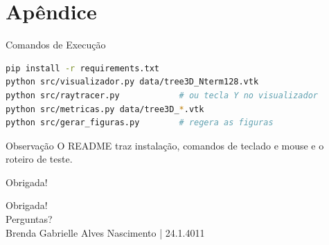 \documentclass[aspectratio=169,11pt]{beamer}
\begin{document}
\appendix
\section{Apêndice}

\begin{frame}[fragile]{Comandos de Execução}
\begin{lstlisting}[language=bash]
pip install -r requirements.txt
python src/visualizador.py data/tree3D_Nterm128.vtk
python src/raytracer.py            # ou tecla Y no visualizador
python src/metricas.py data/tree3D_*.vtk
python src/gerar_figuras.py        # regera as figuras
\end{lstlisting}

\begin{block}{Observação}
O README traz instalação, comandos de teclado e mouse e o roteiro de teste.
\end{block}
\end{frame}

\begin{frame}{Obrigada!}
\begin{center}
{\Huge Obrigada!}\\[0.5cm]
{\large Perguntas?}\\[0.5cm]
Brenda Gabrielle Alves Nascimento | 24.1.4011
\end{center}
\end{frame}
\end{document}
